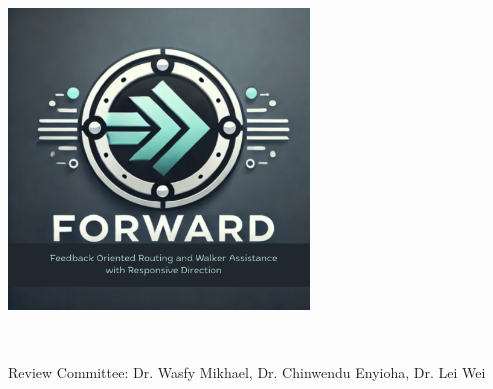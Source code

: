 
\begin{titlepage}
	
	\maketitle
	\thispagestyle{empty}
	\begin{center}
		\includegraphics[width=0.6\textwidth]{./Images/logo.png}
	\end{center}

	\hfill \break \\[\baselineskip]

	\begin{center}
		Review Committee: Dr. Wasfy Mikhael, Dr. Chinwendu Enyioha, Dr. Lei Wei
	\end{center}
	
	\centering
	\hfill \break \\[2\baselineskip]
	
	\fancyhf
	
\end{titlepage}